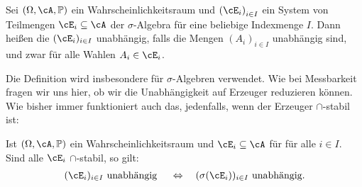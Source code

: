 \begin{deff}\label{Ka}
	Sei $(\Omega, \cA, \mathbb{P})$ ein Wahrscheinlichkeitsraum und ${(\cE_i)}_{i \in I}$ ein System von Teilmengen $\cE_i \subseteq \cA$ der $\sigma$-Algebra f\"ur eine beliebige Indexmenge $I$. Dann heißen die $(\cE_i)_{i\in I}$ unabhängig, falls die Mengen ${(A_i)}_{i \in I}$ unabhängig sind, und zwar f\"ur alle Wahlen $A_i \in \cE_i$.
\end{deff}


\marginpar{\textcolor{red}{Vorlesung 24}}
Die Definition wird insbesondere f\"ur $\sigma$-Algebren verwendet. Wie bei Messbarkeit fragen wir uns hier, ob wir die Unabh\"angigkeit auf Erzeuger reduzieren k\"onnen. Wie bisher immer funktioniert auch das, jedenfalls, wenn der Erzeuger $\cap$-stabil ist:
\begin{prop}\label{unabh}
	Ist $(\Omega, \cA, \mathbb{P})$ ein Wahrscheinlichkeitsraum und $\cE_i \subseteq \cA$ für f\"ur alle $i \in I$. Sind alle $\cE_i$ $\cap$-stabil, so gilt:
	\begin{align*}
		(\cE_i)_{i\in I}\text{ unabhängig }\quad \Leftrightarrow\quad  (\sigma(\cE_i))_{i \in I}\text{ unabhängig.}
	\end{align*}
\end{prop}

